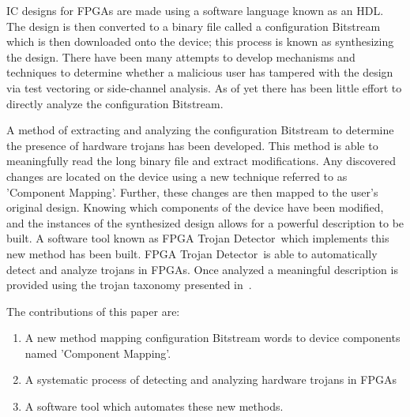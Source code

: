 \documentclass[conference]{IEEEtran}
\newcommand{\Name}{\acrshort{FPGA} Trojan Detector}
\newcommand{\NameNoPeriod}{\Name~}
\begin{document}
\acrshort{IC} designs for \acrfull{FPGAs} are made using a software language known as an \acrfull{HDL}.
The design is then converted to a binary file called a configuration \gls{Bitstream} which is then downloaded onto the device; this process is known as synthesizing the design.
There have been many attempts to develop mechanisms and techniques to determine whether a malicious user has tampered with the design via test vectoring or side-channel analysis.
As of yet there has been little effort to directly analyze the configuration \gls{Bitstream}.

A method of extracting and analyzing the configuration \gls{Bitstream} to determine the presence of hardware trojans has been developed.
This method is able to meaningfully read the long binary file and extract modifications.
Any discovered changes are located on the device using a new technique referred to as 'Component Mapping'.
Further, these changes are then mapped to the user's original design.
Knowing which components of the device have been modified, and the instances of the synthesized design allows for a powerful description to be built.
A software tool known as \NameNoPeriod which implements this new method has been built. 
\NameNoPeriod is able to automatically detect and analyze trojans in \acrshort{FPGAs}.
Once analyzed a meaningful description is provided using the trojan taxonomy presented in~\cite{samerAttribute}.

The contributions of this paper are:
\begin{enumerate}
	\item A new method mapping configuration \gls{Bitstream} words to device components named 'Component Mapping'.
	\item A systematic process of detecting and analyzing hardware trojans in \acrshort{FPGAs}
	\item A software tool which automates these new methods.
\end{enumerate}
\end{document}
